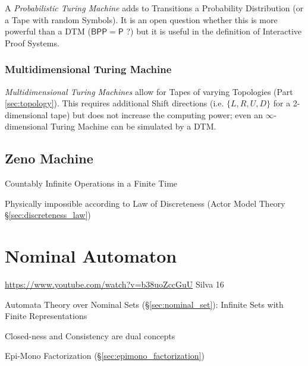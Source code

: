 A \emph{Probabilistic Turing Machine} adds to Transitions a
Probability Distribution (or a Tape with random Symbols). It is an
open question whether this is more powerful than a DTM
($\mathsf{BPP}=\mathsf{P}$ ?)  but it is useful in the definition of
Interactive Proof Systems. %



\subsubsection{Multidimensional Turing Machine}
\label{sec:multidimensional_turing_machine}

\emph{Multidimensional Turing Machines} allow for Tapes of varying
Topologies (Part \ref{sec:topology}). This requires additional Shift
directions (i.e. $\{L, R, U, D\}$ for a 2-dimensional tape) but does
not increase the computing power; even an $\infty$-dimensional Turing
Machine can be simulated by a DTM.



\subsection{Zeno Machine}\label{sec:zeno_machine}

Countably Infinite Operations in a Finite Time

\fist Physically impossible according to Law of Discreteness (Actor
Model Theory \S\ref{sec:discreteness_law})



\section{Nominal Automaton}\label{sec:nominal_automaton}

\url{https://www.youtube.com/watch?v=b38uoZccGuU} Silva 16

Automata Theory over Nominal Sets (\S\ref{sec:nominal_set}): Infinite
Sets with Finite Representations

Closed-ness and Consistency are dual concepts

Epi-Mono Factorization (\S\ref{sec:epimono_factorization})




